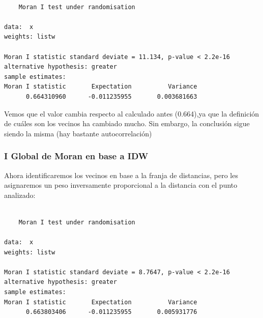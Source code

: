 \documentclass[
  letterpaper,
  DIV=11,
  numbers=noendperiod]{scrreprt}
\newenvironment{Shaded}{\begin{snugshade}}{\end{snugshade}}
\newcommand{\AttributeTok}[1]{\textcolor[rgb]{0.40,0.45,0.13}{#1}}
\newcommand{\CommentTok}[1]{\textcolor[rgb]{0.37,0.37,0.37}{#1}}
\newcommand{\DecValTok}[1]{\textcolor[rgb]{0.68,0.00,0.00}{#1}}
\newcommand{\FunctionTok}[1]{\textcolor[rgb]{0.28,0.35,0.67}{#1}}
\newcommand{\NormalTok}[1]{\textcolor[rgb]{0.00,0.23,0.31}{#1}}
\newcommand{\OtherTok}[1]{\textcolor[rgb]{0.00,0.23,0.31}{#1}}
\newcommand{\SpecialCharTok}[1]{\textcolor[rgb]{0.37,0.37,0.37}{#1}}
\begin{document}
\begin{verbatim}

    Moran I test under randomisation

data:  x  
weights: listw    

Moran I statistic standard deviate = 11.134, p-value < 2.2e-16
alternative hypothesis: greater
sample estimates:
Moran I statistic       Expectation          Variance 
      0.664310960      -0.011235955       0.003681663 
\end{verbatim}

Vemos que el valor cambia respecto al calculado antes (0.664),ya que la
definición de cuáles son los vecinos ha cambiado mucho. Sin embargo, la
conclusión sigue siendo la misma (hay bastante autocorrelación)

\hypertarget{i-global-de-moran-en-base-a-idw}{%
\subsubsection{I Global de Moran en base a
IDW}\label{i-global-de-moran-en-base-a-idw}}

Ahora identificaremos los vecinos en base a la franja de distancias,
pero les asignaremos un peso inversamente proporcional a la distancia
con el punto analizado:

\begin{Shaded}
\end{Shaded}

\begin{verbatim}

    Moran I test under randomisation

data:  x  
weights: listw    

Moran I statistic standard deviate = 8.7647, p-value < 2.2e-16
alternative hypothesis: greater
sample estimates:
Moran I statistic       Expectation          Variance 
      0.663803406      -0.011235955       0.005931776 
\end{verbatim}
\end{document}
